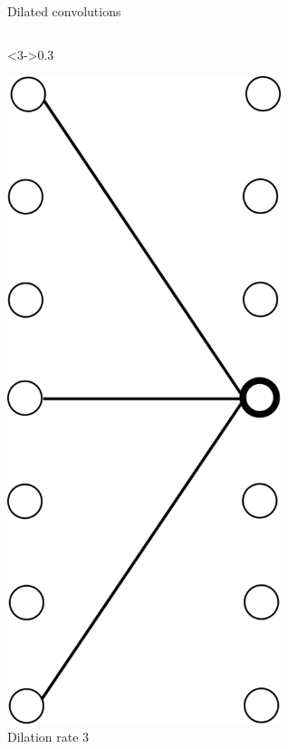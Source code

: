 \documentclass[xcolor=pdftex,dvipsnames,table,mathserif]{beamer}
\begin{document}
\begin{frame}{Dilated convolutions}
\begin{columns}
    \begin{column}<3->{0.3\textwidth}
      \begin{center}
        \includegraphics[width=0.60\textwidth]{dil_conv3.png}
        \\ \scriptsize{Dilation rate 3}
      \end{center}
    \end{column}


  \end{columns}


\end{frame}
\end{document}
